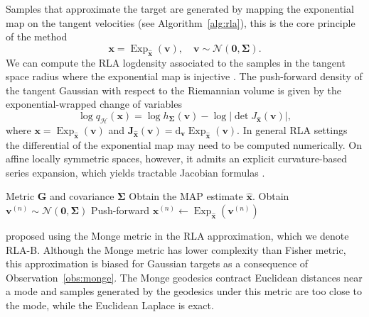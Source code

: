 Samples that approximate the target are generated by mapping the exponential map on the tangent velocities (see Algorithm~\ref{alg:rla}), this is the core principle of the method
\begin{equation}
\boxed{
    \boldsymbol{x}=\operatorname{Exp}_{\hat{\boldsymbol{x}}}(\boldsymbol{v}), \quad \boldsymbol{v}\sim \mathcal{N}(\boldsymbol{0}, \mathbf\Sigma).
    }
\end{equation}
We can compute the RLA logdensity associated to the samples in the tangent space radius where the exponential map is injective  \citep{chevallier2022exponential}.
The push-forward density of the tangent Gaussian
with respect to the Riemannian volume is given by the exponential-wrapped change of variables
\begin{equation*}
\log q_{\mathcal H}(\boldsymbol{x})
=
\log h_{\mathbf{\Sigma}}(\boldsymbol{v})
-
\log \left|\det J_{\hat{\boldsymbol{x}}}(\boldsymbol{v}) \right|,
\end{equation*}
where $\boldsymbol{x}=\operatorname{Exp}_{\hat{\boldsymbol{x}}}(\boldsymbol{v})$ and  $\mathbf{J}_{\hat{\boldsymbol{x}}}(\boldsymbol{v})= \mathrm{d}_{\boldsymbol{v}}
\operatorname{Exp}_{\hat{\boldsymbol{x}}}(\boldsymbol{v})$. In general RLA settings the differential of the exponential map may need to be computed numerically. On affine locally symmetric spaces, however, it admits an explicit curvature-based series expansion, which yields tractable Jacobian formulas \citep{chevallier2022exponential}.
 

\begin{algorithm}[t]
	    \caption{RLA, producing $N$ samples $\boldsymbol{x}^{(n)}$.}    
	    \begin{algorithmic}[1]        
	    \Require Metric $\mathbf{G}$ and covariance $\mathbf{\Sigma}$
	        \State Obtain the MAP estimate $\hat{\boldsymbol{x}}$.        
	            \State Obtain $\boldsymbol{v}^{(n)}\sim \mathcal{N}(\boldsymbol{0}, \mathbf{\Sigma})$
	            \State Push-forward $\boldsymbol{x}^{(n)} \gets \operatorname{Exp}_{\hat{\boldsymbol{x}}}(\boldsymbol{v}^{(n)})$
	        \EndFor
	\end{algorithmic}
	\label{alg:rla}
\end{algorithm}

\citet{Bergamin2024} proposed using the Monge metric in the RLA approximation, which we denote RLA-B. Although the Monge metric has lower complexity than Fisher metric, this approximation is biased for Gaussian targets as a consequence of  Observation~\ref{obs:monge}. The Monge geodesics contract Euclidean distances near a mode and samples generated by the geodesics under this metric are too close to the mode, while the Euclidean Laplace is exact. 

